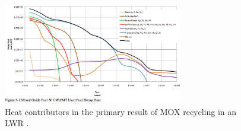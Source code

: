 \begin{figure}[htbp!]
  \begin{center}
    \includegraphics[width=0.7\textwidth]{carter_lwr_mox_heat.eps}
  \end{center}
  \caption{Heat contributors in the primary result of MOX recycling in an LWR
    \cite{carter_us_2011}.}
  \label{fig:carter_lwr_mox_heat}
\end{figure}
